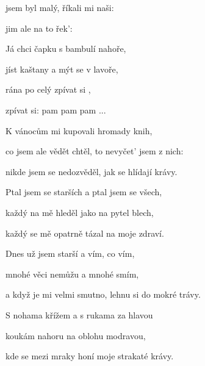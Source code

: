 

\zs
{} jsem byl malý, říkali mi naši:


 jim ale na to řek': 
\ks

\zr
Já chci  čapku s bambulí nahoře,

jíst kaštany a mýt se v lavoře,

 rána po celý  zpívat si ,

zpívat si: pam pam pam    ...
\kr

\zs
K vánocům mi kupovali hromady knih,

co jsem ale vědět chtěl, to nevyčet' jsem z nich:

nikde jsem se nedozvěděl, jak se hlídají krávy.

Ptal jsem se starších a ptal jsem se všech,

každý na mě hleděl jako na pytel blech,

každý se mě opatrně tázal na moje zdraví.
\ks

\zr  \kr

\zs
Dnes už jsem starší a vím, co vím,

mnohé věci nemůžu a mnohé smím,

a když je mi velmi smutno, lehnu si do mokré trávy.

S nohama křížem a s rukama za hlavou

koukám nahoru na oblohu modravou,

kde se mezi mraky honí moje strakaté krávy.
\ks

\zr  \kr

\kp






